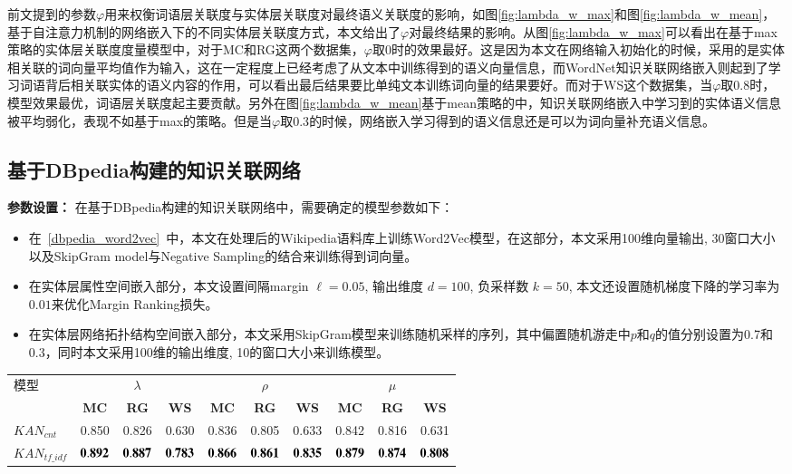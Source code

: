 前文提到的参数$\varphi$用来权衡词语层关联度与实体层关联度对最终语义关联度的影响，如图\ref{fig:lambda_w_max}和图\ref{fig:lambda_w_mean}，基于自注意力机制的网络嵌入下的不同实体层关联度方式，本文给出了$\varphi$对最终结果的影响。从图\ref{fig:lambda_w_max}可以看出在基于max策略的实体层关联度度量模型中，对于MC和RG这两个数据集，$\varphi$取$0$时的效果最好。这是因为本文在网络输入初始化的时候，采用的是实体相关联的词向量平均值作为输入，这在一定程度上已经考虑了从文本中训练得到的语义向量信息，而WordNet知识关联网络嵌入则起到了学习词语背后相关联实体的语义内容的作用，可以看出最后结果要比单纯文本训练词向量的结果要好。而对于WS这个数据集，当$\varphi$取$0.8$时，模型效果最优，词语层关联度起主要贡献。另外在图\ref{fig:lambda_w_mean}基于mean策略的中，知识关联网络嵌入中学习到的实体语义信息被平均弱化，表现不如基于max的策略。但是当$\varphi$取$0.3$的时候，网络嵌入学习得到的语义信息还是可以为词向量补充语义信息。

\subsection{基于DBpedia构建的知识关联网络}
\textbf{参数设置：}
在基于DBpedia构建的知识关联网络中，需要确定的模型参数如下：
\begin{itemize}
    \item 在~\ref{dbpedia_word2vec}~中，本文在处理后的Wikipedia语料库上训练Word2Vec模型，在这部分，本文采用100维向量输出, 30窗口大小以及SkipGram model与Negative Sampling的结合来训练得到词向量。
    \item 在实体层属性空间嵌入部分，本文设置间隔margin $\ell=0.05$, 输出维度 $d=100$, 负采样数 $k=50$, 本文还设置随机梯度下降的学习率为$0.01$来优化Margin Ranking损失。
    \item 在实体层网络拓扑结构空间嵌入部分，本文采用SkipGram模型来训练随机采样的序列，其中偏置随机游走中$p$和$q$的值分别设置为0.7和0.3，同时本文采用100维的输出维度, 10的窗口大小来训练模型。
\end{itemize}


\begin{table*}[htbp]
    \center
    \vspace{5pt}
    \begin{tabular}{|l|c|c|c|c|c|c|c|c|c|}
    \hline
    \multirow{2}{*}{模型} & \multicolumn{3}{c|}{$\lambda$}     & \multicolumn{3}{c|}{$\rho$}          & \multicolumn{3}{c|}{$\mu$} \\ \cline{2-10} 
                           & \textbf{MC}&\textbf{RG}&\textbf{WS} & \textbf{MC}&\textbf{RG}&\textbf{WS} & \textbf{MC}&\textbf{RG}&\textbf{WS}\\ \hline
    $KAN_{cnt}$            & 0.850 & 0.826 & 0.630 & 0.836 & 0.805 & 0.633 & 0.842 & 0.816 & 0.631   \\ \hline
    $KAN_{tf\_idf}$        & $\bf 0.892$  & $\bf 0.887$ & $\bf 0.783$ & $\bf 0.866$ & $\bf 0.861$ & $\bf 0.835$ & $\bf 0.879$ & $\bf 0.874$ & $\bf 0.808$ \\ \hline
    \end{tabular}
    \label{table5-6}
\end{table*}


